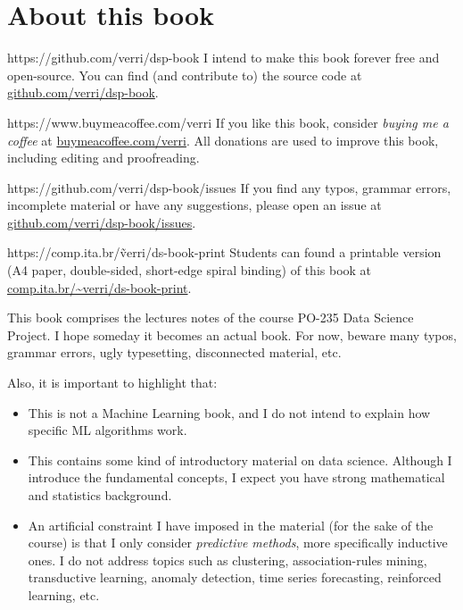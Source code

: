 \chapter{About this book}

\begin{parwithqr}{https://github.com/verri/dsp-book}
  I intend to make this book forever free and open-source. You can find (and contribute
  to) the source code at \href{\aurl}{github.com/verri/dsp-book}.
\end{parwithqr}

\vfill

\begin{parwithqr}{https://www.buymeacoffee.com/verri}
  If you like this book, consider \emph{buying me a coffee} at
  \href{\aurl}{buymeacoffee.com/verri}.   All donations are used to improve this book,
  including editing and proofreading.
\end{parwithqr}

\vfill

\begin{parwithqr}{https://github.com/verri/dsp-book/issues}
  If you find any typos, grammar errors, incomplete material or have any suggestions,
  please open an issue at \href{\aurl}{github.com/verri/dsp-book/issues}.
\end{parwithqr}

\vfill

\begin{parwithqr}{https://comp.ita.br/\~verri/ds-book-print}
  Students can found a printable version (A4 paper, double-sided, short-edge spiral
  binding) of this book at \href{\aurl}{comp.ita.br/\textasciitilde{}verri/ds-book-print}.
\end{parwithqr}

\newpage
This book comprises the lectures notes of the course PO-235 Data Science Project.
I hope someday it becomes an actual book. For now, beware many typos, grammar errors, ugly
typesetting, disconnected material, etc.

Also, it is important to highlight that:
\begin{itemize}
  \item This is not a Machine Learning book, and I do not intend to explain how specific
    ML algorithms work.
  \item This contains some kind of introductory material on data science.  Although I
    introduce the fundamental concepts, I expect you have strong mathematical and
    statistics background.
  \item An artificial constraint I have imposed in the material (for the sake of the
    course) is that I only consider \emph{predictive methods}, more specifically
    inductive ones. I do not address topics such as clustering, association-rules
    mining, transductive learning, anomaly detection, time series forecasting, reinforced
    learning, etc.
\end{itemize}

